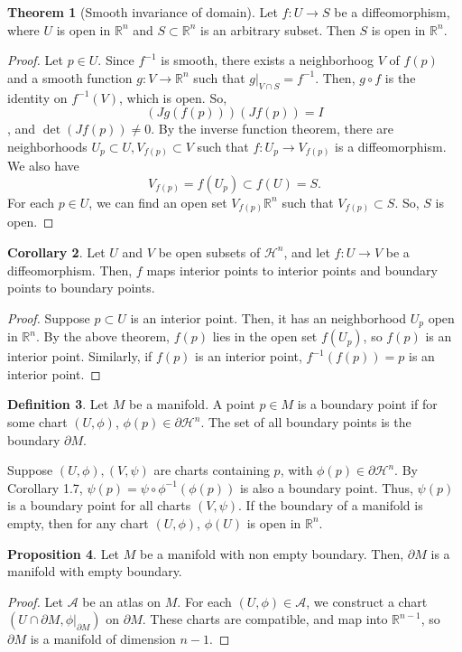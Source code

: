 \documentclass[]{article}
\DeclareMathOperator{\Det}{det}
\theoremstyle{definition}
\newtheorem{theorem}{Theorem}[section] %
\theoremstyle{definition}
\newtheorem{definition}[theorem]{Definition} %
\newtheorem{corollary}[theorem]{Corollary}
\newtheorem{proposition}[theorem]{Proposition}
\begin{document}
\begin{theorem}[Smooth invariance of domain]
    Let $f:U\rightarrow S$ be a diffeomorphism, where $U$ is open in $\mathbb{R}^n$ and $S\subset \mathbb{R}^n$ is an arbitrary subset. Then $S$ is open in $\mathbb{R}^n$.
\end{theorem}
\begin{proof}
    Let $p\in U$. Since $f^{-1}$ is smooth, there exists a neighborhoog $V$ of $f(p)$ and a smooth function $g:V \rightarrow \mathbb{R}^n$ such that $g|_{V\cap S}=f^{-1}$. Then, $g\circ f$ is the identity on $f^{-1}(V)$, which is open. So, \[(Jg(f(p)))(Jf(p))=I\], and $\Det(Jf(p))\neq 0$. By the inverse function theorem, there are neighborhoods $U_p\subset U, V_{f(p)}\subset V$ such that $f:U_p \rightarrow V_{f(p)}$ is a diffeomorphism. We also have \[V_{f(p)}=f(U_p)\subset f(U)=S.\] For each $p\in U$, we can find an open set $V_{f(p)}\mathbb{R}^n$ such that $V_{f(p)}\subset S$. So, $S$ is open.
\end{proof}

\begin{corollary}
    Let $U$ and $V$ be open subsets of $\mathcal{H}^n$, and let $f:U \rightarrow V$ be a diffeomorphism. Then, $f$ maps interior points to interior points and boundary points to boundary points.
\end{corollary}
\begin{proof} 
    Suppose $p\subset U$ is an interior point. Then, it has an neighborhood $U_p$ open in $\mathbb{R}^n$. By the above theorem, $f(p)$ lies in the open set $f(U_p)$, so $f(p)$ is an interior point. Similarly, if $f(p)$ is an interior point, $f^{-1}(f(p))=p$ is an interior point.
\end{proof}

\begin{definition}
    Let $M$ be a manifold. A point $p\in M$ is a boundary point if for some chart $(U, \phi)$, $\phi(p)\in \partial \mathcal{H}^n$. The set of all boundary points is the boundary $\partial M$.
\end{definition}

Suppose $(U,\phi),(V,\psi)$ are charts containing $p$, with $\phi(p)\in\partial \mathcal{H}^n $. By Corollary 1.7, $\psi(p)=\psi\circ\phi^{-1}(\phi(p))$ is also a boundary point. Thus, $\psi(p)$ is a boundary point for all charts $(V, \psi)$. If the boundary of a manifold is empty, then for any chart $(U, \phi)$, $\phi(U)$ is open in $\mathbb{R}^n$.

\begin{proposition}
    Let $M$ be a manifold with non empty boundary. Then, $\partial M$ is a manifold with empty boundary.
\end{proposition}
\begin{proof}
    Let $\mathcal{A}$ be an atlas on $M$. For each $(U, \phi)\in \mathcal{A}$, we construct a chart $(U\cap \partial M , \phi|_{\partial M})$ on $\partial M$. These charts are compatible, and map into $\mathbb{R}^{n-1}$, so $\partial M$ is a manifold of dimension $n-1$.
\end{proof}
\end{document}

